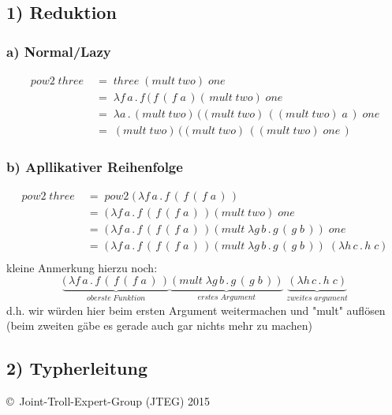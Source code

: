 \documentclass{article}
\begin{document}
	\subsection*{1) Reduktion}
	\subsubsection*{a) Normal/Lazy}
		\begin{align*}
			 pow2\;three\;	&=\;	three\;(mult\;two)\;one\\
			 				&=\;	\lambda f\,a\, .\,f\,(\,f\,(\,f\;a\,)(\,mult\;two)\;one\\
			 				&=\;	\lambda a\, .\, (mult\;two)\,((mult\;two)\,((mult\;two)\;a\,)\;one\\
			 				&=\;	(mult\;two)\,((mult\;two)\,((mult\;two)\;one\,)
		\end{align*}
	\subsubsection*{b) Apllikativer Reihenfolge}
		\begin{align*}
			pow2\;three\;	&=\;	pow2\; (\, \lambda f\,a\, .\,f\,(\,f\,(\,f\;a\,) \,)\\
							&=\;	(\, \lambda f\,a\, .\,f\,(\,f\,(\,f\;a\,) \,)(mult\;two)\;one\\
							&=\;	(\, \lambda f\,a\, .\,f\,(\,f\,(\,f\;a\,) \,)(mult\;\lambda g\,b\, .\,g\,(\,g\;b\,))\;one\\
							&=\;	(\, \lambda f\,a\, .\,f\,(\,f\,(\,f\;a\,) \,)(mult\;\lambda g\,b\, .\,g\,(\,g\;b\,))\;(\lambda h\,c\, .\,h\;c)\\
		\end{align*}
	kleine Anmerkung hierzu noch:
	\[
		\underbrace{(\, \lambda f\,a\, .\,f\,(\,f\,(\,f\;a\,) \,)}_{oberste\;Funktion}
		\underbrace{(mult\;\lambda g\,b\, .\,g\,(\,g\;b\,))}_{erstes\;Argument}
		\;
		\underbrace{(\lambda h\,c\, .\,h\;c)}_{zweites\;argument}
	\]
	d.h. wir w\"urden hier beim ersten Argument weitermachen und "mult" aufl\"osen
	(beim zweiten g\"abe es gerade auch gar nichts mehr zu machen)

	\subsection*{2) Typherleitung}
		
		
		
		
		
		
		
		
		
		
		
		
		
		
		
		
		
		
	\begin{tiny}
	\copyright\ Joint-Troll-Expert-Group (JTEG) 2015
	\end{tiny}
\end{document}
